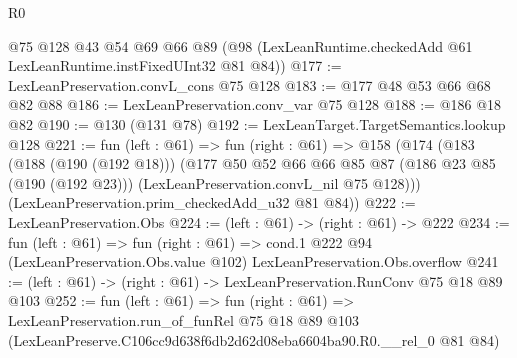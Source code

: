 \begin{lexlean}{R0}
\begin{coremodule}
    @75
    @128
    @43
    @54
    @69
    @66
    @89
    (@98 (LexLeanRuntime.checkedAdd @61 LexLeanRuntime.instFixedUInt32 @81 @84))
@177 := LexLeanPreservation.convL_cons @75 @128
@183 := @177 @48 @53 @66 @68 @82 @88
@186 := LexLeanPreservation.conv_var @75 @128
@188 := @186 @18 @82
@190 := @130 (@131 @78)
@192 := LexLeanTarget.TargetSemantics.lookup @128
@221 := fun (left : @61) =>
  fun (right : @61) =>
  @158
    (@174
      (@183
        (@188 (@190 (@192 @18)))
        (@177
          @50
          @52
          @66
          @66
          @85
          @87
          (@186 @23 @85 (@190 (@192 @23)))
          (LexLeanPreservation.convL_nil @75 @128)))
      (LexLeanPreservation.prim_checkedAdd_u32 @81 @84))
@222 := LexLeanPreservation.Obs
@224 := (left : @61) -> (right : @61) -> @222
@234 := fun (left : @61) =>
  fun (right : @61) =>
  cond.{1} @222 @94 (LexLeanPreservation.Obs.value @102) LexLeanPreservation.Obs.overflow
@241 := (left : @61) -> (right : @61) -> LexLeanPreservation.RunConv @75 @18 @89 @103
@252 := fun (left : @61) =>
  fun (right : @61) =>
  LexLeanPreservation.run_of_funRel
    @75
    @18
    @89
    @103
    (LexLeanPreserve.C106cc9d638f6db2d62d08eba6604ba90.R0.__rel_0 @81 @84)
\end{coremodule}
\end{lexlean}
